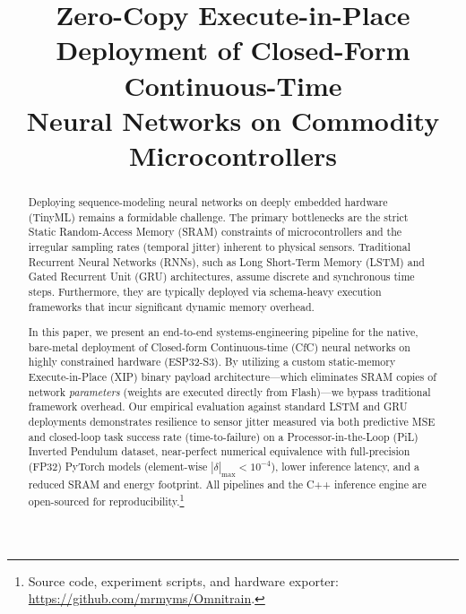 \documentclass[conference]{IEEEtran}
\begin{document}
\title{Zero-Copy Execute-in-Place Deployment of Closed-Form Continuous-Time\\
       Neural Networks on Commodity Microcontrollers}

\author{%
}

\maketitle

\begin{abstract}
Deploying sequence-modeling neural networks on deeply embedded hardware
(TinyML) remains a formidable challenge. The primary bottlenecks are the
strict Static Random-Access Memory (SRAM) constraints of microcontrollers and
the irregular sampling rates (temporal jitter) inherent to physical sensors.
Traditional Recurrent Neural Networks (RNNs), such as Long Short-Term Memory
(LSTM) and Gated Recurrent Unit (GRU) architectures, assume discrete and
synchronous time steps. Furthermore, they are typically deployed via
schema-heavy execution frameworks that incur significant dynamic memory
overhead.

In this paper, we present an end-to-end systems-engineering pipeline for the
native, bare-metal deployment of Closed-form Continuous-time (CfC) neural
networks on highly constrained hardware (ESP32-S3). By utilizing a custom
static-memory Execute-in-Place (XIP) binary payload architecture—which
eliminates SRAM copies of network \emph{parameters} (weights are executed
directly from Flash)—we bypass traditional framework overhead. Our empirical
evaluation against standard LSTM and GRU deployments demonstrates resilience
to sensor jitter measured via both predictive MSE and closed-loop task success
rate (time-to-failure) on a Processor-in-the-Loop (PiL) Inverted Pendulum
dataset, near-perfect numerical equivalence with full-precision (FP32) PyTorch
models (element-wise $|\delta|_{\max} < 10^{-4}$), lower inference latency,
and a reduced SRAM and energy footprint. All pipelines and the C++ inference
engine are open-sourced for
reproducibility.\footnote{Source code, experiment scripts, and hardware
exporter: \url{https://github.com/mrmyms/Omnitrain}.}
\end{abstract}
\end{document}
